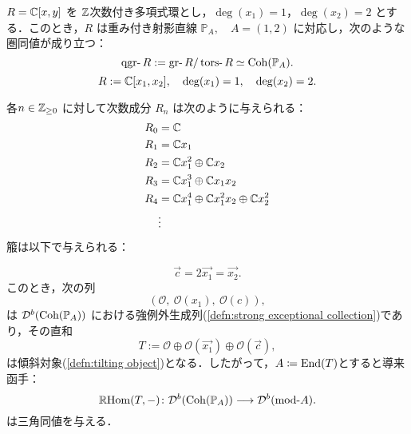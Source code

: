 \begin{exmp}
	$R = {\mathbb C}[x, y]$ を ${\mathbb Z}$次数付き多項式環とし，$\deg(x_1) = 1$，$\deg(x_2) = 2$ とする．このとき，$R$ は重み付き射影直線 $\mathbb{P}_{A},\quad A = (1,2)$ に対応し，次のような圏同値が成り立つ：
\[
	\qgr R := \gr R / \tors R \simeq \Coh(\mathbb{P}_{A}).
\]
\[
R := {\mathbb C}[x_1, x_2], \quad \deg(x_1) = 1,\quad \deg(x_2) = 2.
\]

各\(n \in {\mathbb Z}_{\ge 0}\) に対して次数成分 \(R_n\) は次のように与えられる：
\[
\begin{aligned}
R_0 &= {\mathbb C} \\
R_1 &= {\mathbb C} x_1 \\
R_2 &= {\mathbb C} x_1^2 \oplus {\mathbb C} x_2 \\
R_3 &= {\mathbb C} x_1^3 \oplus {\mathbb C} x_1 x_2 \\
R_4 &= {\mathbb C} x_1^4 \oplus {\mathbb C} x_1^2 x_2 \oplus {\mathbb C} x_2^2 \\
&\vdots 
\end{aligned}
\]
箙は以下で与えられる：
\begin{center}
  \end{center}
	\[\vec{c} = 2\vec{x_1} = \vec{x_2}.\]
このとき，次の列
\[
(\mathcal{O},\ \mathcal{O}(x_1),\ \mathcal{O}(c)),
\]
は \({\mathcal D}^b(\operatorname{\mathrm{Coh}}(\mathbb{P}_A))\) における強例外生成列(\ref{defn:strong exceptional collection})であり，その直和
\[
	T := \mathcal{O} \oplus \mathcal{O}(\vec{x_1}) \oplus \mathcal{O}(\vec{c}),
\]
は傾斜対象(\ref{defn:tilting object})となる．したがって，$A \coloneq \operatorname{\mathrm{End}}(T)$とすると導来函手：
\[
\RHom(T, -) \colon \D^b(\Coh(\mathbb{P}_A)) \longrightarrow \D^b(\mod A).
\]
は三角同値を与える．
\end{exmp}

